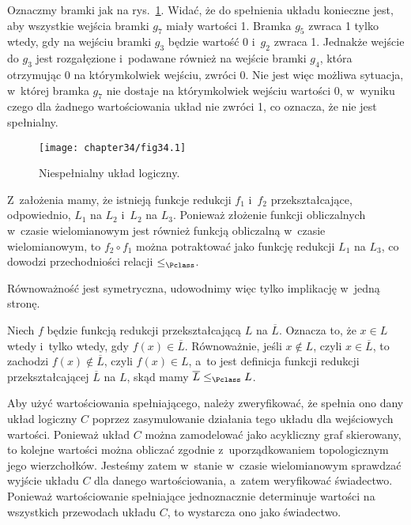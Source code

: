 
\exercise %
Oznaczmy bramki jak na rys.\ \ref{fig:34.3-1}.
Widać, że do spełnienia układu konieczne jest, aby wszystkie wejścia bramki $g_7$ miały wartości 1.
Bramka $g_5$ zwraca 1 tylko wtedy, gdy na wejściu bramki $g_3$ będzie wartość 0 i~$g_2$ zwraca 1.
Jednakże wejście do $g_3$ jest rozgałęzione i~podawane również na wejście bramki $g_4$, która otrzymując 0 na którymkolwiek wejściu, zwróci 0.
Nie jest więc możliwa sytuacja, w~której bramka $g_7$ nie dostaje na którymkolwiek wejściu wartości 0, w~wyniku czego dla żadnego wartościowania układ nie zwróci 1, co oznacza, że nie jest spełnialny.
\begin{figure}[ht]
	\begin{center}
		\texttt{[image: chapter34/fig34.1]}
	\end{center}
	\caption{Niespełnialny układ logiczny.} \label{fig:34.3-1}
\end{figure}

\exercise %
Z~założenia mamy, że istnieją funkcje redukcji $f_1$ i~$f_2$ przekształcające, odpowiednio, $L_1$ na $L_2$ i~$L_2$ na $L_3$.
Ponieważ złożenie funkcji obliczalnych w~czasie wielomianowym jest również funkcją obliczalną w~czasie wielomianowym, to $f_2\circ f_1$ można potraktować jako funkcję redukcji $L_1$ na $L_3$, co dowodzi przechodniości relacji $\le_\Pclass$.

\exercise %
Równoważność jest symetryczna, udowodnimy więc tylko implikację w~jedną stronę.

Niech $f$ będzie funkcją redukcji przekształcającą $L$ na $\overline{L}$.
Oznacza to, że $x\in L$ wtedy i~tylko wtedy, gdy $f(x)\in\overline{L}$.
Równoważnie, jeśli $x\notin L$, czyli $x\in\overline{L}$, to zachodzi $f(x)\notin\overline{L}$, czyli $f(x)\in L$, a~to jest definicja funkcji redukcji przekształcającej $\overline{L}$ na $L$, skąd mamy $\overline{L}\le_\Pclass L$.

\exercise %
Aby użyć wartościowania spełniającego, należy zweryfikować, że spełnia ono dany układ logiczny $C$ poprzez zasymulowanie działania tego układu dla wejściowych wartości.
Ponieważ układ $C$ można zamodelować jako acykliczny graf skierowany, to kolejne wartości można obliczać zgodnie z~uporządkowaniem topologicznym jego wierzchołków.
Jesteśmy zatem w~stanie w~czasie wielomianowym sprawdzać wyjście układu $C$ dla danego wartościowania, a~zatem weryfikować świadectwo.
Ponieważ wartościowanie spełniające jednoznacznie determinuje wartości na wszystkich przewodach układu $C$, to wystarcza ono jako świadectwo.


